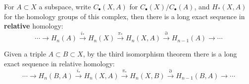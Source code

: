 \documentclass{article}
\begin{document}
\begin{corollary}
    For $A\subset X$ a subspace, write $C_\bullet(X,A)$ for $C_\bullet(X)/C_\bullet(A)$, and $H_*(X,A)$ for the homology groups of this complex, then there is a long exact sequence in \textbf{relative} homology: \[
    \cdots \rightarrow H_n(A) \xrightarrow{i_*} H_n(X) \xrightarrow{\pi_*} H_n(X,A) \xrightarrow{\partial} H_{n-1}(A) \rightarrow \cdots
    \]
\end{corollary}

\begin{corollary}
    Given a triple $A\subset B \subset X$, by the third isomorphism theorem there is a long exact sequence in relative homology: \[
    \cdots \rightarrow H_n(B,A) \xrightarrow{i_*} H_n(X,A) \xrightarrow{\pi_*} H_n(X,B) \xrightarrow{\partial} H_{n-1}(B,A) \rightarrow \cdots
    \]
\end{corollary}
\end{document}
